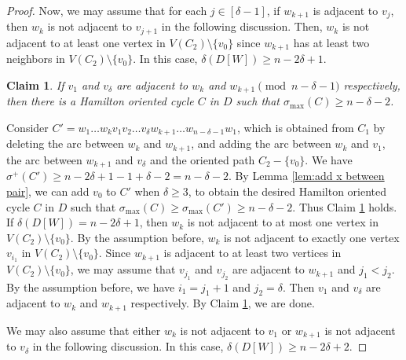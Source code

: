 \documentclass[11pt]{article}
\newtheorem{claim}{Claim}
\newcommand{\QGr}[1]{{#1}}
\newcommand{\2}{\vspace{0.2cm}}
\begin{document}
\begin{proof}
Now, we may assume that for each $j\in [\delta-1]$, if $w_{k+1}$ is adjacent to $v_j$, then $w_{k}$ is not adjacent to $v_{j+1}$ in the following discussion. Then, $w_k$ is not adjacent to at least one vertex in $V(C_2)\setminus\{v_0\}$ since $w_{k+1}$ has at least two neighbors in $V(C_2)\setminus\{v_0\}$. In this case, $\delta(D[W])\ge n-2\delta+1$.
\begin{claim}\label{claim:2.2-2}
    If $v_1$ and $v_{\delta}$ are adjacent to $w_k$ and $w_{k+1} \pmod{n-\delta-1}$ respectively, then there is a Hamilton oriented cycle $C$ in $D$ such that $\sigma_{\max}(C) \ge n-\delta-2$.
\end{claim}
 Consider $C' = w_1\ldots w_k v_{1}v_{2} \ldots v_{\delta}w_{k+1} \ldots w_{n-\delta-1}w_1$, which is obtained from $C_1$ by deleting the arc between $w_k$ and $w_{k+1}$, and adding the arc between $w_k$ and $v_{1}$, the arc between $w_{k+1}$ and $v_{\delta}$ and \QGr{the oriented path $C_2-\{v_0\}$.} We have $\sigma^+(C') \ge n-2\delta +1 - 1 + \delta -2=n-\delta -2$. By Lemma \ref{lem:add x between pair}, we can add $v_0$ to $C'$ when $\delta \ge 3$, to obtain the desired Hamilton oriented cycle $C$ in $D$ such that $\sigma_{\max}(C)\ge  \sigma_{\max}(C') \ge n-\delta - 2$.  Thus Claim \ref{claim:2.2-2} holds.\\

 If $\delta(D[W])=n-2\delta+1$, then $w_k$ is not adjacent to at most one vertex in $V(C_2)\setminus\{v_0\}$. By the assumption before, $w_k$ is not adjacent to exactly one vertex $v_{i_1}$ in $V(C_2)\setminus\{v_0\}$. Since $w_{k+1}$ is adjacent to at least two vertices in $V(C_2)\setminus\{v_0\}$, we may assume that $v_{j_1}$ and $v_{j_2}$ are adjacent to $w_{k+1}$ and $j_1<j_2$. By the assumption before, we have $i_1=j_1+1$ and $j_2=\delta$. Then $v_1$ and $v_{\delta}$ are adjacent to $w_k$ and $w_{k+1}$ respectively. By Claim \ref{claim:2.2-2}, we are done.

 We may also assume that either $w_{k}$ is not adjacent to $v_{1}$ or $w_{k+1}$ is not adjacent to $v_{\delta}$ in the following discussion. In this case, $\delta(D[W])\ge n-2\delta+2$.


\end{proof}
\end{document}
